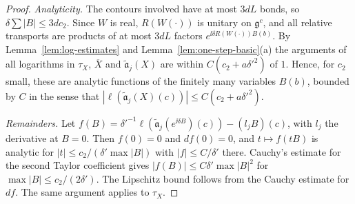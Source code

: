 \begin{proof}
\emph{Analyticity.} The contours involved have at most $3dL$ bonds, so $\delta\sum|B|\le3dc_2$. Since $W$ is real, $R(W(\cdot))$ is unitary on $\mathfrak g^c$, and all relative transports are products of at most $3dL$ factors $e^{\ii\delta R(W(\cdot))B(b)}$. By Lemma~\ref{lem:log-estimates} and Lemma~\ref{lem:one-step-basic}(a) the arguments of all logarithms in $\tau_X$, $\overline X$ and $\tilde{\mathfrak a}_j(X)$ are within $C(c_2+a\delta'^2)$ of $1$. Hence, for $c_2$ small, these are analytic functions of the finitely many variables $B(b)$, bounded by $C$ in the sense that $|\ell(\tilde{\mathfrak a}_j(X)(c))|\le C(c_2+a\delta'^2)$.

\emph{Remainders.} Let $f(B)=\delta'^{-1}\ell(\tilde{\mathfrak a}_j(e^{\ii\delta B})(c))-(l_jB)(c)$, with $l_j$ the derivative at $B=0$. Then $f(0)=0$ and $df(0)=0$, and $t\mapsto f(tB)$ is analytic for $|t|\le c_2/(\delta'\max|B|)$ with $|f|\le C/\delta'$ there. Cauchy's estimate for the second Taylor coefficient gives $|f(B)|\le C\delta'\max|B|^2$ for $\max|B|\le c_2/(2\delta')$. The Lipschitz bound follows from the Cauchy estimate for $df$. The same argument applies to $\tau_X$.


\end{proof}
